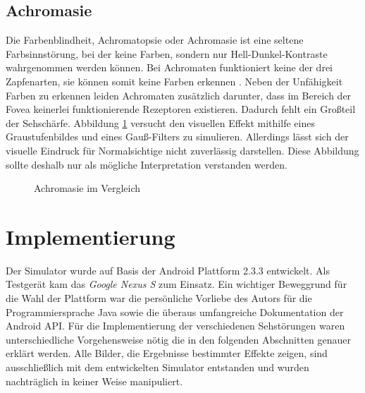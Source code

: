 \documentclass[a4paper]{article}
\begin{document}
\subsection*{Achromasie}
Die Farbenblindheit, Achromatopsie oder Achromasie ist eine seltene Farbsinnstörung, bei der keine Farben, sondern nur Hell-Dunkel-Kontraste wahrgenommen werden können. Bei Achromaten funktioniert keine der drei Zapfenarten, sie können somit keine Farben erkennen \cite{WP-A}. Neben der Unfähigkeit Farben zu erkennen leiden Achromaten zusätzlich darunter, dass im Bereich der Fovea keinerlei funktionierende Rezeptoren existieren. Dadurch fehlt ein Großteil der Sehschärfe. Abbildung \ref{achromate} versucht den visuellen Effekt mithilfe eines Graustufenbildes und eines Gauß-Filters zu simulieren. Allerdings lässt sich der visuelle Eindruck für Normalsichtige nicht zuverlässig darstellen. Diese Abbildung sollte deshalb nur als mögliche Interpretation verstanden werden.

\begin{figure}[H]
\centering
{}
\caption{Achromasie im Vergleich}
\label{achromate}
\end{figure}

\newpage

\section*{Implementierung}
Der Simulator wurde auf Basis der Android Plattform 2.3.3 entwickelt. Als Testgerät kam das \textit{Google Nexus S} zum Einsatz. Ein wichtiger Beweggrund für die Wahl der Plattform war die persönliche Vorliebe des Autors für die Programmiersprache Java sowie die überaus umfangreiche Dokumentation der Android API. Für die Implementierung der verschiedenen Sehstörungen waren  unterschiedliche Vorgehensweise nötig die in den folgenden Abschnitten genauer erklärt werden. Alle Bilder, die Ergebnisse bestimmter Effekte zeigen, sind ausschließlich mit dem entwickelten Simulator entstanden und wurden nachträglich in keiner Weise manipuliert.
\end{document}

